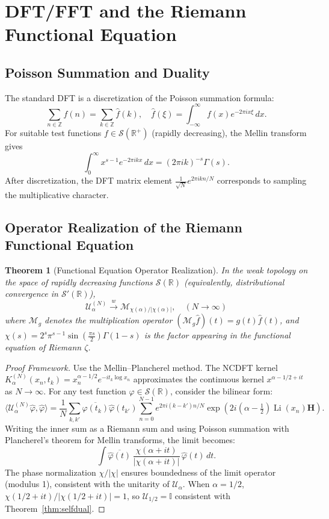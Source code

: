 \documentclass[12pt,a4paper]{amsart}
\theoremstyle{plain}
\newtheorem{theorem}{Theorem}[section]
\theoremstyle{definition}
\theoremstyle{remark}
\begin{document}
\section{DFT/FFT and the Riemann Functional Equation}

\subsection{Poisson Summation and Duality}

The standard DFT is a discretization of the Poisson summation formula:
\[
\sum_{n\in\mathbb{Z}} f(n) = \sum_{k\in\mathbb{Z}} \hat{f}(k), \quad \hat{f}(\xi) = \int_{-\infty}^\infty f(x) e^{-2\pi i x\xi}\,dx.
\]
For suitable test functions $f\in\mathcal{S}(\mathbb{R}^+)$ (rapidly decreasing), the Mellin transform gives
\[
\int_0^\infty x^{s-1} e^{-2\pi i k x}\, dx = (2\pi i k)^{-s} \Gamma(s).
\]
After discretization, the DFT matrix element $\frac{1}{\sqrt{N}} e^{2\pi i k n/N}$ corresponds to sampling the multiplicative character.

\subsection{Operator Realization of the Riemann Functional Equation}

\begin{theorem}[Functional Equation Operator Realization]\label{thm:operatorfe}
In the weak topology on the space of rapidly decreasing functions $\mathcal{S}(\mathbb{R})$ (equivalently, distributional convergence in $\mathcal{S}'(\mathbb{R})$),
\[
\mathcal{U}_\alpha^{(N)} \xrightarrow{w} \mathcal{M}_{\chi(\alpha)/|\chi(\alpha)|}, \quad (N\to\infty)
\]
where $\mathcal{M}_{g}$ denotes the multiplication operator $(\mathcal{M}_g \hat{f})(t) = g(t)\hat{f}(t)$, and $\chi(s)=2^s\pi^{s-1}\sin(\frac{\pi s}{2})\Gamma(1-s)$ is the factor appearing in the functional equation of Riemann $\zeta$.
\end{theorem}

\begin{proof}[Proof Framework]
Use the Mellin--Plancherel method. The NCDFT kernel $K_{\alpha}^{(N)}(x_{n},t_{k})= x_{n}^{\alpha-1/2}e^{-i t_{k}\log x_{n}}$ approximates the continuous kernel $x^{\alpha-1/2+it}$ as $N \to\infty$. For any test function $\varphi\in\mathcal{S}(\mathbb{R})$, consider the bilinear form:
\[
\langle \mathcal{U}_\alpha^{(N)}\hat{\varphi},\hat{\varphi}\rangle = \frac{1}{N}\sum_{k,k'}\overline{\hat{\varphi}(t_k)}\hat{\varphi}(t_{k'})\sum_{n=0}^{N-1} e^{2\pi i(k-k')n/N} \exp\left(2i(\alpha-\tfrac12)\operatorname{Li}(x_n)\mathbf{H}\right).
\]
Writing the inner sum as a Riemann sum and using Poisson summation with Plancherel's theorem for Mellin transforms, the limit becomes:
\[
\int \overline{\hat{\varphi}(t)}\,\frac{\chi(\alpha+it)}{|\chi(\alpha+it)|}\,\hat{\varphi}(t)\,dt.
\]
The phase normalization $\chi/|\chi|$ ensures boundedness of the limit operator (modulus 1), consistent with the unitarity of $\mathcal{U}_\alpha$. When $\alpha=1/2$, $\chi(1/2+it)/|\chi(1/2+it)|=1$, so $\mathcal{U}_{1/2}=\mathbb{I}$ consistent with Theorem~\ref{thm:selfdual}.
\end{proof}
\end{document}
